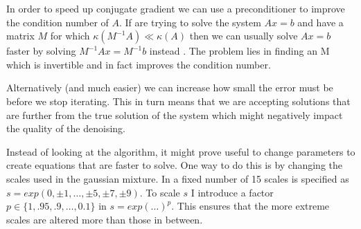 \documentclass{article}
\begin{document}
In order to speed up conjugate gradient we can use a preconditioner to 
improve the condition number of $A$. If are trying to solve the system 
$Ax = b$ and have a matrix $M$ for which $\kappa(M^{-1}A) \ll \kappa(A)$ 
then we can usually solve $Ax = b$ faster by solving $M^{-1}Ax = 
M^{-1}b$ instead \citep{pain}. The problem lies in finding an M which is 
invertible and in fact improves the condition number.

Alternatively (and much easier) we can increase how small the error must 
be before we stop iterating. This in turn means that we are accepting 
solutions that are further from the true solution of the system which 
might negatively impact the quality of the denoising.

Instead of looking at the algorithm, it might prove useful to change 
parameters to create equations that are faster to solve. One way to do 
this is by changing the scales used in the gaussian mixture. In 
\citep{uwe} a fixed number of 15 scales is specified as $s = exp(0, 
\pm1, \ldots, \pm5, \pm7, \pm9)$. To scale $s$ I introduce a factor $p 
\in \{1, .95, .9, \ldots , 0.1\}$ in $s = exp(\ldots)^p$. This ensures 
that the more extreme scales are altered more than those in between.
%
%
%





\end{document}
